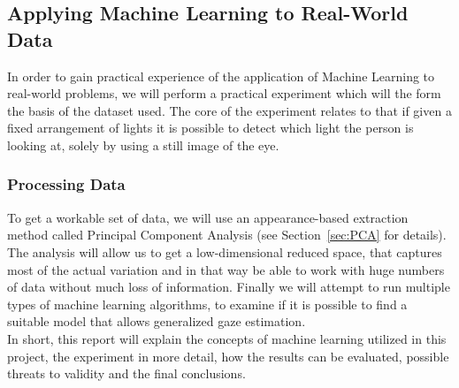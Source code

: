 \subsection{Applying Machine Learning to Real-World Data}
In order to gain practical experience of the application of Machine Learning to real-world problems, we will perform a practical experiment
which will the form the basis of the dataset used.
The core of the experiment relates to that if given a fixed arrangement of lights 
it is possible to detect which light the person is looking at, solely by using a still image of the eye.

\subsubsection{Processing Data}
\label{sub:Processing Data}
To get a workable set of data, we will use an appearance-based extraction method called Principal Component Analysis (see Section~\ref{sec:PCA} for details).
The analysis will allow us to get a low-dimensional reduced space, that captures most of the actual variation and in that way
be able to work with huge numbers of data without much loss of information.
Finally we will attempt to run multiple types of machine learning algorithms,
to examine if it is possible to find a suitable model that allows generalized gaze estimation.  \\

In short, this report will explain the concepts of machine learning utilized in this project,
the experiment in more detail, how the results can be evaluated, possible threats to validity and the final conclusions.
